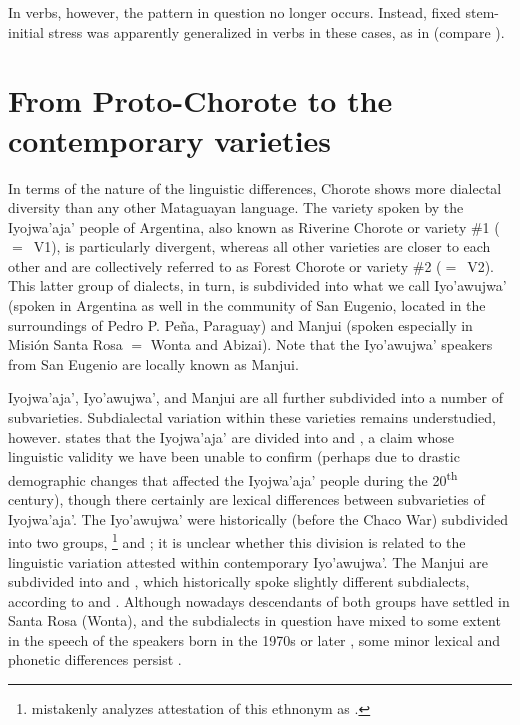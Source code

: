 In verbs, however, the pattern in question no longer occurs. Instead, fixed stem-initial stress was apparently generalized in verbs in these cases, as in  (compare ).

\section{From Proto-Chorote to the contemporary varieties} \label{ch-dialects}

In terms of the nature of the linguistic differences, Chorote shows more dialectal diversity than any other Mataguayan language. The variety spoken by the Iyojwa’aja’ people of Argentina, also known as Riverine Chorote or variety \#1 ($=$~V1), is particularly divergent, whereas all other varieties are closer to each other and are collectively referred to as Forest Chorote or variety \#2 ($=$~V2). This latter group of dialects, in turn, is subdivided into what we call Iyo’awujwa’ (spoken in Argentina as well in the community of San Eugenio, located in the surroundings of Pedro P. Peña, Paraguay) and Manjui (spoken especially in Misión Santa Rosa $=$ Wonta and Abizai). Note that the Iyo’awujwa’ speakers from San Eugenio are locally known as Manjui.

Iyojwa’aja’, Iyo’awujwa’, and Manjui are all further subdivided into a number of subvarieties. Subdialectal variation within these varieties remains understudied, however. \citet{AG78} states that the Iyojwa’aja’ are divided into  and , a claim whose linguistic validity we have been unable to confirm (perhaps due to drastic demographic changes that affected the Iyojwa’aja’ people during the 20\textsuperscript{th} century), though there certainly are lexical differences between subvarieties of Iyojwa’aja’. The Iyo’awujwa’ were historically (before the Chaco War) subdivided into two groups, \footnote{\citet[8]{JC14a} mistakenly analyzes  attestation of this ethnonym as .} and ; it is unclear whether this division is related to the linguistic variation attested within contemporary Iyo’awujwa’. The Manjui are subdivided into  and , which historically spoke slightly different subdialects, according to \citet[5--8]{JC14a} and \citet[5]{GH94}. Although nowadays descendants of both groups have settled in Santa Rosa (Wonta), and the subdialects in question have mixed to some extent in the speech of the speakers born in the 1970s or later \citep[8]{JC18}, some minor lexical and phonetic differences persist \citep{GH94,JC-amer}.

